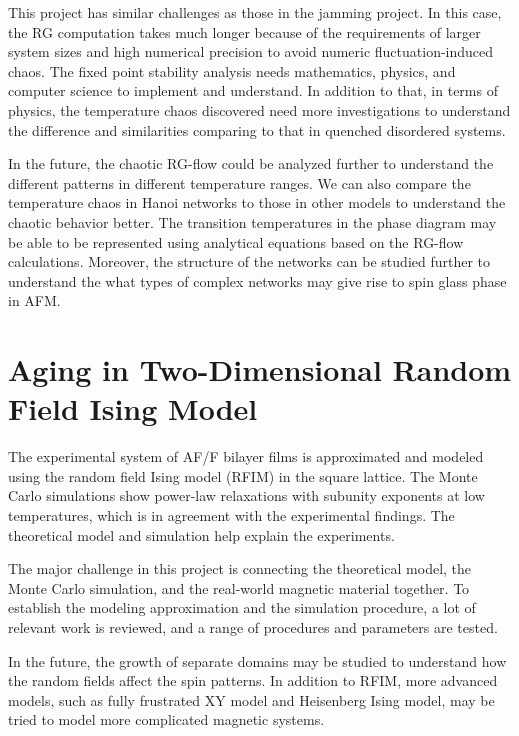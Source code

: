 This project has similar challenges as those in the jamming project. In this case, the RG computation takes much longer because of the requirements of larger system sizes and high numerical precision to avoid numeric fluctuation-induced chaos. The fixed point stability analysis needs mathematics, physics, and computer science to implement and understand. In addition to that, in terms of physics, the temperature chaos discovered need more investigations to understand the difference and similarities comparing to that in quenched disordered systems. 

In the future, the chaotic RG-flow could be analyzed further to understand the different patterns in different temperature ranges. We can also compare the temperature chaos in Hanoi networks to those in other models to understand the chaotic behavior better. The transition temperatures in the phase diagram may be able to be represented using analytical equations based on the RG-flow calculations. Moreover, the structure of the networks can be studied further to understand the what types of complex networks may give rise to spin glass phase in AFM.


\section{Aging in Two-Dimensional Random Field Ising Model}
The experimental system of AF/F bilayer films is approximated and modeled using the random field Ising model (RFIM) in the square lattice. The Monte Carlo simulations show power-law relaxations with subunity exponents at low temperatures, which is in agreement with the experimental findings. The theoretical model and simulation help explain the experiments.

The major challenge in this project is connecting the theoretical model, the Monte Carlo simulation, and the real-world magnetic material together. To establish the modeling approximation and the simulation procedure, a lot of relevant work is reviewed, and a range of procedures and parameters are tested.

In the future, the growth of separate domains may be studied to understand how the random fields affect the spin patterns. In addition to RFIM, more advanced models, such as fully frustrated XY model and Heisenberg Ising model, may be tried to model more complicated magnetic systems. 













